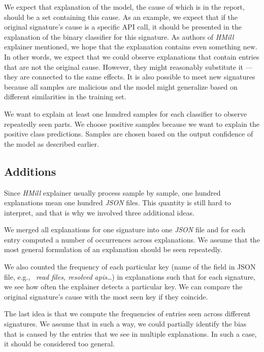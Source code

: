 We expect that explanation of the model, the cause of which is in the report, should be a set containing this cause. As an example, we expect that if the original signature's cause is a specific API call, it should be presented in the explanation of the binary classifier for this signature. As authors of \emph{HMill} explainer mentioned, we hope that the explanation contains even something new. In other words, we expect that we could observe explanations that contain entries that are not the original cause. However, they might reasonably substitute it --- they are connected to the same effects. It is also possible to meet new signatures because all samples are malicious and the model might generalize based on different similarities in the training set.

We want to explain at least one hundred samples for each classifier to observe repeatedly seen parts. We choose positive samples because we want to explain the positive class predictions. Samples are chosen based on the output confidence of the model as described earlier.

\subsection{Additions}
Since \emph{HMill} explainer usually process sample by sample, one hundred explanations mean one hundred \emph{JSON} files. This quantity is still hard to interpret, and that is why we involved three additional ideas.

We merged all explanations for one signature into one \emph{JSON} file and for each entry computed a number of occurrences across explanations. We assume that the most general formulation of an explanation should be seen repeatedly. 

We also counted the frequency of each particular key (name of the field in JSON file, e.g., \ \emph{read files, resolved apis}\dots) in explanations such that for each signature, we see how often the explainer detects a particular key. We can compare the original signature's cause with the most seen key if they coincide.

The last idea is that we compute the frequencies of entries seen across different signatures. We assume that in such a way, we could partially identify the bias that is caused by the entries that we see in multiple explanations. In such a case, it should be considered too general.





